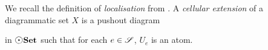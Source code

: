 \begin{dfn} \label{dfn:localisation}
    We recall the definition of \emph{localisation} from \cite[Section 2.4]{chanavat2024model}.
    A \emph{cellular extension} of a diagrammatic set \( X \) is a pushout diagram
    \begin{center}
    \end{center}
    in \( \dgmSet \) such that for each \( e \in \mathscr{S} \), \( U_e \) is an atom.


\end{dfn}
